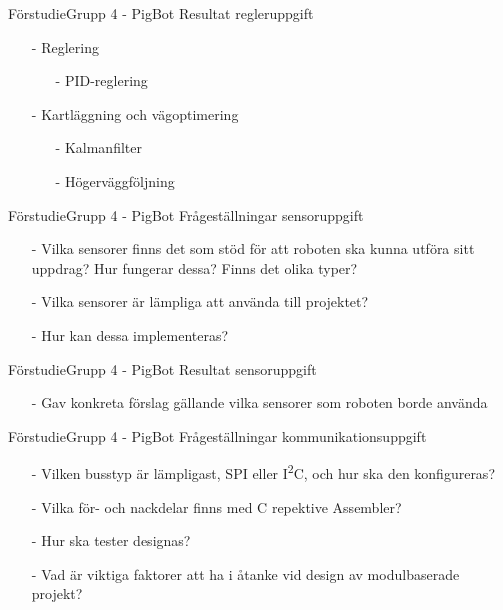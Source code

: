 
\begin{frame}{Förstudie}{Grupp 4 - PigBot}
Resultat regleruppgift
\pause
  \begin{itemize}
    \item[-] Reglering
\begin{itemize}
	\item [-] PID-reglering
\end{itemize}

    \item[-] Kartläggning och vägoptimering
\begin{itemize}
	\item [-] Kalmanfilter
	\item [-] Högerväggföljning
\end{itemize}
  \end{itemize}
\end{frame}


\begin{frame}{Förstudie}{Grupp 4 - PigBot}
Frågeställningar sensoruppgift
\pause
\begin{itemize}
    \item[-] Vilka sensorer finns det som stöd för att roboten ska kunna utföra sitt uppdrag? Hur fungerar dessa? Finns det olika typer?
    \item[-] Vilka sensorer är lämpliga att använda till projektet?
    \item[-] Hur kan dessa implementeras?
\end{itemize}
\end{frame}


\begin{frame}{Förstudie}{Grupp 4 - PigBot}
Resultat sensoruppgift
  \begin{itemize}
\pause
    \item[-] Gav konkreta förslag gällande vilka sensorer som roboten borde använda 
  \end{itemize}
\end{frame}

\begin{frame}{Förstudie}{Grupp 4 - PigBot}
Frågeställningar kommunikationsuppgift
\pause
\begin{itemize}
	\item[-] Vilken busstyp är lämpligast, SPI eller I\textsuperscript{2}C, och hur ska den konfigureras?
	\item[-] Vilka för- och nackdelar finns med C repektive Assembler? 
	\item[-] Hur ska tester designas?
	\item[-] Vad är viktiga faktorer att ha i åtanke vid design av modulbaserade projekt?
\end{itemize}
\end{frame}

